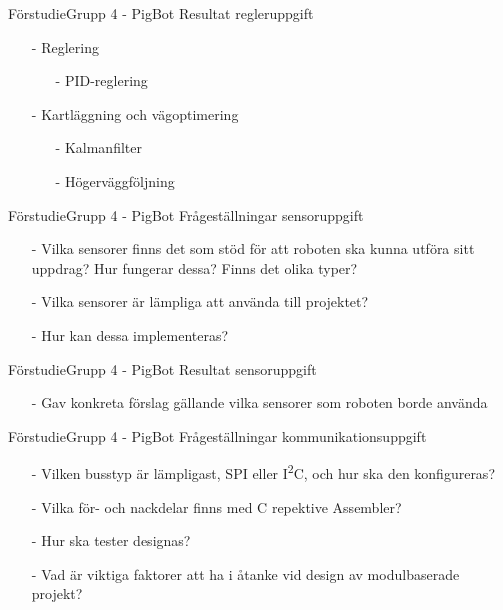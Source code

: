 
\begin{frame}{Förstudie}{Grupp 4 - PigBot}
Resultat regleruppgift
\pause
  \begin{itemize}
    \item[-] Reglering
\begin{itemize}
	\item [-] PID-reglering
\end{itemize}

    \item[-] Kartläggning och vägoptimering
\begin{itemize}
	\item [-] Kalmanfilter
	\item [-] Högerväggföljning
\end{itemize}
  \end{itemize}
\end{frame}


\begin{frame}{Förstudie}{Grupp 4 - PigBot}
Frågeställningar sensoruppgift
\pause
\begin{itemize}
    \item[-] Vilka sensorer finns det som stöd för att roboten ska kunna utföra sitt uppdrag? Hur fungerar dessa? Finns det olika typer?
    \item[-] Vilka sensorer är lämpliga att använda till projektet?
    \item[-] Hur kan dessa implementeras?
\end{itemize}
\end{frame}


\begin{frame}{Förstudie}{Grupp 4 - PigBot}
Resultat sensoruppgift
  \begin{itemize}
\pause
    \item[-] Gav konkreta förslag gällande vilka sensorer som roboten borde använda 
  \end{itemize}
\end{frame}

\begin{frame}{Förstudie}{Grupp 4 - PigBot}
Frågeställningar kommunikationsuppgift
\pause
\begin{itemize}
	\item[-] Vilken busstyp är lämpligast, SPI eller I\textsuperscript{2}C, och hur ska den konfigureras?
	\item[-] Vilka för- och nackdelar finns med C repektive Assembler? 
	\item[-] Hur ska tester designas?
	\item[-] Vad är viktiga faktorer att ha i åtanke vid design av modulbaserade projekt?
\end{itemize}
\end{frame}

